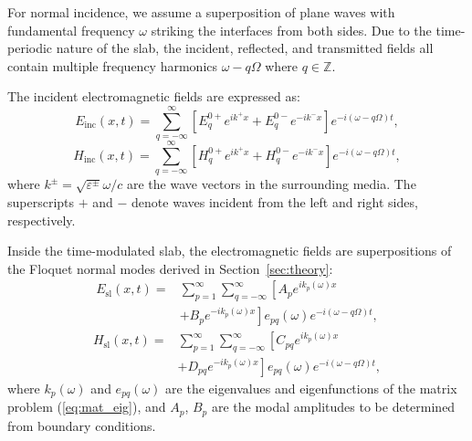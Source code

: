 \documentclass[%
 reprint,
 amsmath,amssymb,
 aps,
 prb,
]{revtex4-2}
\begin{document}
For normal incidence, we assume a superposition of plane waves with fundamental frequency $\omega$ striking the interfaces from both sides. Due to the time-periodic nature of the slab, the incident, reflected, and transmitted fields all contain multiple frequency harmonics $\omega - q\Omega$ where $q \in \mathbb{Z}$.

The incident electromagnetic fields are expressed as:
\begin{equation}
    E_{\mathrm{inc}}(x, t) = \sum_{q=-\infty}^{\infty}\left[E^{0+}_{q} e^{ik^{+} x}
    + E^{0-}_{q} e^{-ik^{-} x}\right]e^{-i(\omega - q \Omega) t}, \label{eq:incident_E}
\end{equation}
\begin{equation}
    H_{\mathrm{inc}}(x, t) = \sum_{q=-\infty}^{\infty}\left[H^{0+}_{q} e^{ik^{+} x}
    + H^{0-}_{q} e^{-ik^{-} x}\right]e^{-i(\omega - q \Omega) t}, \label{eq:incident_H}
\end{equation}
where $k^{\pm}= \sqrt{\varepsilon^{\pm}} \omega / c$ are the wave vectors in the surrounding media. The superscripts $+$ and $-$ denote waves incident from the left and right sides, respectively.

Inside the time-modulated slab, the electromagnetic fields are superpositions of the Floquet normal modes derived in Section~\ref{sec:theory}:
\begin{equation}
    \begin{split}
    E_{\mathrm{sl}}(x, t) = &\sum_{p=1}^{\infty} \sum_{q=-\infty}^{\infty}\left[A_{p} e^{ik_{p}(\omega) x} \right. \\
    &\left. + B_{p} e^{-ik_{p}(\omega) x}\right] e_{pq}(\omega) e^{-i(\omega - q \Omega) t}, \label{eq:slab_E}
    \end{split}
\end{equation}
\begin{equation}
    \begin{split}
    H_{\mathrm{sl}}(x, t) = &\sum_{p=1}^{\infty} \sum_{q=-\infty}^{\infty}\left[C_{pq} e^{ik_{p}(\omega) x} \right. \\
    &\left. + D_{pq} e^{-ik_{p}(\omega) x}\right] e_{pq}(\omega) e^{-i(\omega - q \Omega) t}, \label{eq:slab_H}
    \end{split}
\end{equation}
where $k_p(\omega)$ and $e_{pq}(\omega)$ are the eigenvalues and eigenfunctions of the matrix problem (\ref{eq:mat_eig}), and $A_p$, $B_p$ are the modal amplitudes to be determined from boundary conditions.
\end{document}
